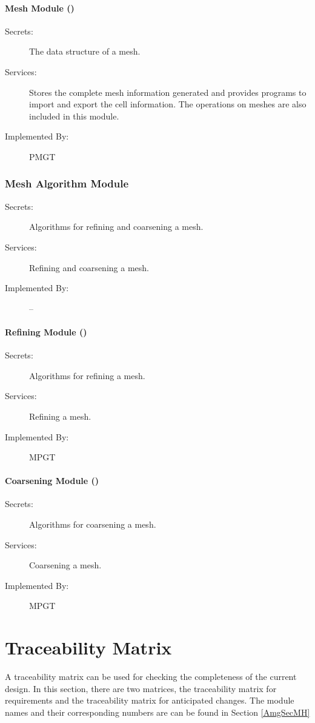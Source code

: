 \documentclass[12pt,titlepage]{article}
\begin{document}
\paragraph{Mesh Module ()}
\begin{description}
\item[Secrets:] The data structure of a mesh.
\item[Services:] Stores the complete mesh information generated and provides programs to import and export the cell information. The operations on meshes are also included in this module.
\item[Implemented By:] PMGT
\end{description}

\subsubsection{Mesh Algorithm Module}
\begin{description}
\item[Secrets:] Algorithms for refining and coarsening a mesh.
\item[Services:] Refining and coarsening a mesh.
\item[Implemented By:]-- 
\end{description}

\paragraph{Refining Module ()}
\begin{description}
\item[Secrets:] Algorithms for refining a mesh.
\item[Services:] Refining a mesh.
\item[Implemented By:] MPGT 
\end{description}

\paragraph{Coarsening Module ()}
\begin{description}
\item[Secrets:] Algorithms for coarsening a mesh.
\item[Services:] Coarsening a mesh.
\item[Implemented By:] MPGT 
\end{description}

\section{Traceability Matrix \label{AmgSecTM}}
A traceability matrix can be used for checking the completeness of the current design. In this section, there are two matrices, the traceability matrix for requirements and the traceability matrix for anticipated changes. The module names and their corresponding numbers are can be found in Section \ref{AmgSecMH}\\
\end{document}
